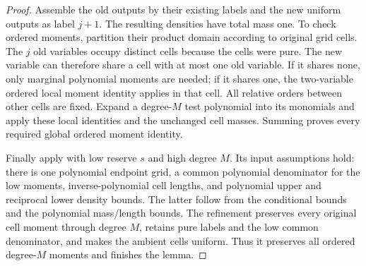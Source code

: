 \documentclass[11pt]{article}
\begin{document}
\begin{proof}
Assemble the old outputs by their existing labels and the new uniform
outputs as label $j+1$. The resulting densities have total mass one.
To check ordered moments, partition their product domain according to
original grid cells. The $j$ old variables occupy distinct cells because
the cells were pure. The new variable can therefore share a cell with
at most one old variable. If it shares none, only marginal polynomial
moments are needed; if it shares one, the two-variable ordered local
moment identity applies in that cell. All relative orders between
other cells are fixed. Expand a degree-$M$ test polynomial into its
monomials and apply these local identities and the unchanged cell
masses. Summing proves every required global ordered moment identity.

Finally apply
with low reserve $s$ and high degree $M$. Its input assumptions hold:
there is one polynomial endpoint grid, a common polynomial denominator
for the low moments, inverse-polynomial cell lengths, and polynomial
upper and reciprocal lower density bounds. The latter follow from the
conditional bounds and the polynomial mass/length bounds. The refinement
preserves every original cell moment through degree $M$, retains pure
labels and the low common denominator, and makes the ambient cells
uniform. Thus it preserves all ordered degree-$M$ moments and finishes
the lemma.
\end{proof}
\end{document}
